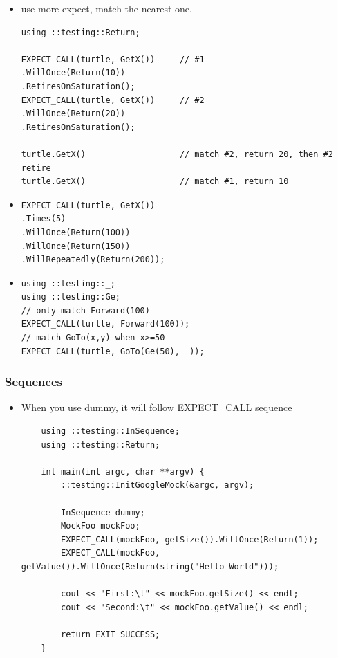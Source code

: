 \documentclass[a4paper,11pt,twoside]{book}
\begin{document}
\begin{itemize}
\item use more expect, match the nearest one.
\begin{lstlisting}
using ::testing::Return;

EXPECT_CALL(turtle, GetX())		// #1
.WillOnce(Return(10))
.RetiresOnSaturation();
EXPECT_CALL(turtle, GetX())		// #2
.WillOnce(Return(20))
.RetiresOnSaturation();

turtle.GetX()					// match #2, return 20, then #2 retire
turtle.GetX()					// match #1, return 10
\end{lstlisting}	

\item 
\begin{lstlisting}
EXPECT_CALL(turtle, GetX())
.Times(5)
.WillOnce(Return(100))
.WillOnce(Return(150))
.WillRepeatedly(Return(200));	
\end{lstlisting}

\item 
\begin{lstlisting}
using ::testing::_;
using ::testing::Ge;
// only match Forward(100)
EXPECT_CALL(turtle, Forward(100));
// match GoTo(x,y) when x>=50
EXPECT_CALL(turtle, GoTo(Ge(50), _));
\end{lstlisting}

\end{itemize}

\subsubsection{Sequences}
\begin{itemize}
	\item When you use dummy, it will follow EXPECT\_CALL sequence
\begin{lstlisting}
	using ::testing::InSequence;
	using ::testing::Return;
	
	int main(int argc, char **argv) {
		::testing::InitGoogleMock(&argc, argv);
		
		InSequence dummy;
		MockFoo mockFoo;
		EXPECT_CALL(mockFoo, getSize()).WillOnce(Return(1));
		EXPECT_CALL(mockFoo, getValue()).WillOnce(Return(string("Hello World")));
		
		cout << "First:\t" << mockFoo.getSize() << endl;
		cout << "Second:\t" << mockFoo.getValue() << endl;
		
		return EXIT_SUCCESS;
	}
\end{lstlisting}

\end{itemize}
\end{document}
